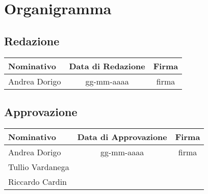 \chapter{Organigramma}\label{Organigramma}

\section{Redazione}\label{7.1}
\quad
\def\tabularxcolumn#1{m{#1}}
{	
	\begin{center}
		\renewcommand{\arraystretch}{1.4}
		\begin{tabularx}{\textwidth}{|X|c|c|}
			\hline
			\rowcolor{airforceblue}
			\textbf{Nominativo} & \textbf{Data di Redazione} & \textbf{Firma}\\
			\hline
			Andrea Dorigo & gg-mm-aaaa & firma\\
		\end{tabularx}
	\end{center}

\section{Approvazione}\label{7.2}
\quad
\def\tabularxcolumn#1{m{#1}}
{	
	\begin{center}
		\renewcommand{\arraystretch}{1.4}
		\begin{tabularx}{\textwidth}{|X|c|c|}
			\hline
			\rowcolor{airforceblue}
			\textbf{Nominativo} & \textbf{Data di Approvazione} & \textbf{Firma}\\
			\hline
			Andrea Dorigo & gg-mm-aaaa & firma\\
			\hline
			Tullio Vardanega & &\\
			Riccardo Cardin & &\\
		\end{tabularx}
	\end{center}

}}
